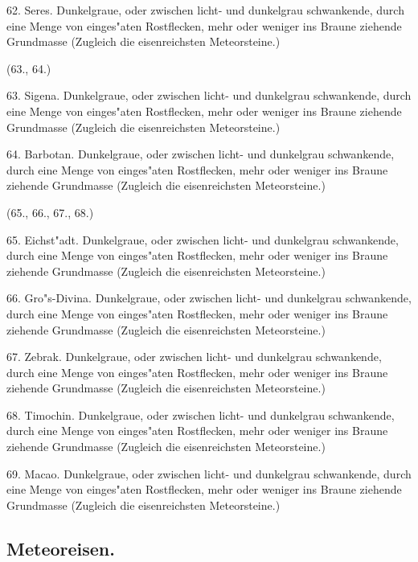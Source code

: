\documentclass[a4paper, 11pt, oneside, polutonikogreek, german]{article}
\begin{document}
62. Seres. Dunkelgraue, oder zwischen licht- und dunkelgrau schwankende, durch eine Menge von einges"aten Rostflecken, mehr oder weniger ins Braune ziehende Grundmasse (Zugleich die eisenreichsten Meteorsteine.)

\begin{center}
(63., 64.)
\end{center}

63. Sigena. Dunkelgraue, oder zwischen licht- und dunkelgrau schwankende, durch eine Menge von einges"aten Rostflecken, mehr oder weniger ins Braune ziehende Grundmasse (Zugleich die eisenreichsten Meteorsteine.)

64. Barbotan. Dunkelgraue, oder zwischen licht- und dunkelgrau schwankende, durch eine Menge von einges"aten Rostflecken, mehr oder weniger ins Braune ziehende Grundmasse (Zugleich die eisenreichsten Meteorsteine.)

\begin{center}
(65., 66., 67., 68.)
\end{center}

65. Eichst"adt. Dunkelgraue, oder zwischen licht- und dunkelgrau schwankende, durch eine Menge von einges"aten Rostflecken, mehr oder weniger ins Braune ziehende Grundmasse (Zugleich die eisenreichsten Meteorsteine.)

66. Gro"s-Divina. Dunkelgraue, oder zwischen licht- und dunkelgrau schwankende, durch eine Menge von einges"aten Rostflecken, mehr oder weniger ins Braune ziehende Grundmasse (Zugleich die eisenreichsten Meteorsteine.)

67. Zebrak. Dunkelgraue, oder zwischen licht- und dunkelgrau schwankende, durch eine Menge von einges"aten Rostflecken, mehr oder weniger ins Braune ziehende Grundmasse (Zugleich die eisenreichsten Meteorsteine.)

68. Timochin. Dunkelgraue, oder zwischen licht- und dunkelgrau schwankende, durch eine Menge von einges"aten Rostflecken, mehr oder weniger ins Braune ziehende Grundmasse (Zugleich die eisenreichsten Meteorsteine.)

\vspace{2ex}

69. Macao. Dunkelgraue, oder zwischen licht- und dunkelgrau schwankende, durch eine Menge von einges"aten Rostflecken, mehr oder weniger ins Braune ziehende Grundmasse (Zugleich die eisenreichsten Meteorsteine.)
\subsection{Meteoreisen.}
\end{document}
